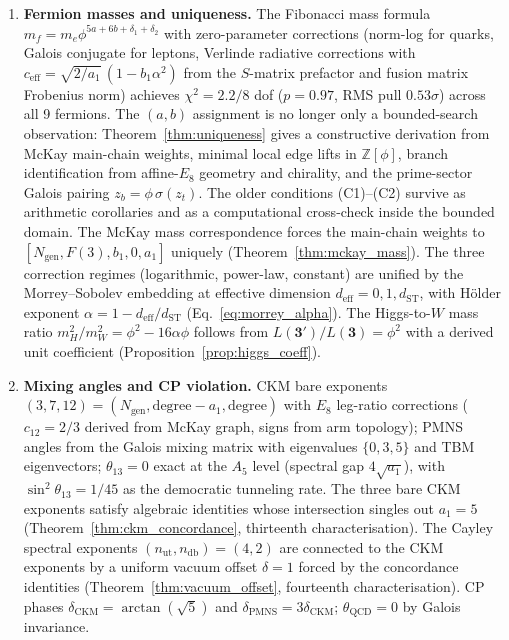 \documentclass[12pt,a4paper]{article}
\theoremstyle{definition}
\begin{document}
\begin{enumerate}
\item \textbf{Fermion masses and uniqueness.}  The Fibonacci mass formula $m_f = m_e \phi^{5a+6b+\delta_1+\delta_2}$ with zero-parameter corrections (norm-log for quarks, Galois conjugate for leptons, Verlinde radiative corrections with $c_{\mathrm{eff}} = \sqrt{2/a_1}\,(1-b_1\alpha^2)$ from the $S$-matrix prefactor and fusion matrix Frobenius norm) achieves $\chi^2 = 2.2/8$ dof ($p = 0.97$, RMS pull $0.53\sigma$) across all 9 fermions.  The $(a,b)$ assignment is no longer only a bounded-search observation: Theorem~\ref{thm:uniqueness} gives a constructive derivation from McKay main-chain weights, minimal local edge lifts in $\mathbb{Z}[\phi]$, branch identification from affine-$E_8$ geometry and chirality, and the prime-sector Galois pairing $z_b = \phi\,\sigma(z_t)$.  The older conditions (C1)--(C2) survive as arithmetic corollaries and as a computational cross-check inside the bounded domain.  The McKay mass correspondence forces the main-chain weights to $[N_{\text{gen}}, F(3), b_1, 0, a_1]$ uniquely (Theorem~\ref{thm:mckay_mass}).  The three correction regimes (logarithmic, power-law, constant) are unified by the Morrey--Sobolev embedding at effective dimension $d_{\text{eff}} = 0, 1, d_{\text{ST}}$, with H\"{o}lder exponent $\alpha = 1 - d_{\text{eff}}/d_{\text{ST}}$ (Eq.~\ref{eq:morrey_alpha}).  The Higgs-to-$W$ mass ratio $m_H^2/m_W^2 = \phi^2 - 16\alpha\phi$ follows from $L(\mathbf{3'})/L(\mathbf{3}) = \phi^2$ with a derived unit coefficient (Proposition~\ref{prop:higgs_coeff}).

\item \textbf{Mixing angles and CP violation.}  CKM bare exponents $(3,7,12) = (N_{\text{gen}}, \text{degree}-a_1, \text{degree})$ with $E_8$ leg-ratio corrections ($c_{12} = 2/3$ derived from McKay graph, signs from arm topology); PMNS angles from the Galois mixing matrix with eigenvalues $\{0, 3, 5\}$ and TBM eigenvectors; $\theta_{13} = 0$ exact at the $A_5$ level (spectral gap $4\sqrt{a_1}$), with $\sin^2\theta_{13} = 1/45$ as the democratic tunneling rate.  The three bare CKM exponents satisfy algebraic identities whose intersection singles out $a_1 = 5$ (Theorem~\ref{thm:ckm_concordance}, thirteenth characterisation).  The Cayley spectral exponents $(n_{\text{ut}}, n_{\text{db}}) = (4, 2)$ are connected to the CKM exponents by a uniform vacuum offset $\delta = 1$ forced by the concordance identities (Theorem~\ref{thm:vacuum_offset}, fourteenth characterisation).  CP phases $\delta_{\text{CKM}} = \arctan(\sqrt{5})$ and $\delta_{\text{PMNS}} = 3\delta_{\text{CKM}}$; $\theta_{\text{QCD}} = 0$ by Galois invariance.


\end{enumerate}
\end{document}
